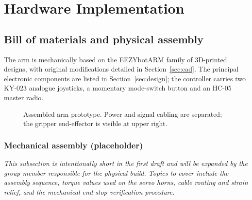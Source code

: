 \section{Hardware Implementation}
\label{sec:hardware}

\subsection{Bill of materials and physical assembly}
The arm is mechanically based on the EEZYbotARM family of 3D-printed
designs, with original modifications detailed in
Section~\ref{sec:cad}. The principal electronic components are
listed in Section~\ref{sec:design}; the controller carries two KY-023
analogue joysticks, a momentary mode-switch button and an HC-05
master radio.

\begin{figure}[t]
  \centering
  \caption{Assembled arm prototype. Power and signal cabling are
  separated; the gripper end-effector is visible at upper right.}
  \label{fig:armphoto}
\end{figure}

\subsubsection*{Mechanical assembly (placeholder)}
\emph{This subsection is intentionally short in the first draft and
will be expanded by the group member responsible for the physical
build. Topics to cover include the assembly sequence, torque values
used on the servo horns, cable routing and strain relief, and the
mechanical end-stop verification procedure.}


